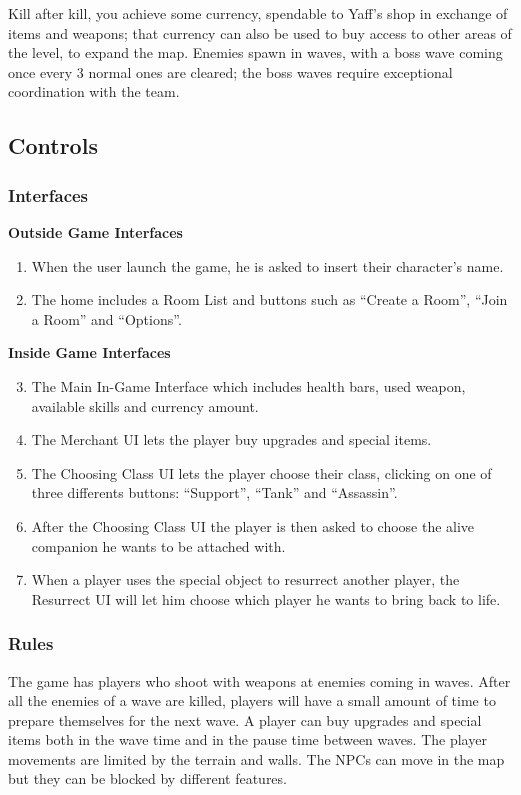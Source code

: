 \documentclass[12pt]{article}
\begin{document}
Kill after kill, you achieve some currency, spendable to Yaff’s shop in exchange of items and weapons; that currency can also be used to buy access to other areas of the level, to expand the map. Enemies spawn in waves, with a boss wave coming once every 3 normal ones are cleared; the boss waves require exceptional coordination with the team.

\subsection{Controls}

\subsubsection{Interfaces}

\textbf{Outside Game Interfaces}
\begin{enumerate}
	\item When the user launch the game, he is asked to insert their character’s name.
	\item The home includes a Room List and buttons such as “Create a Room”, “Join a Room” and “Options”.
\end{enumerate}

\textbf{Inside Game Interfaces}
\begin{enumerate}
	\setcounter{enumi}{2}
	\item The Main In-Game Interface which includes health bars, used weapon, available skills and currency amount.
	\item The Merchant UI lets the player buy upgrades and special items.
	\item The Choosing Class UI lets the player choose their class, clicking on one of three differents buttons: “Support”, “Tank” and “Assassin”.
	\item After the Choosing Class UI the player is then asked to choose the alive companion he wants to be attached with.
	\item When a player uses the special object to resurrect another player, the Resurrect UI will let him choose which player he wants to bring back to life.
\end{enumerate}

\subsubsection{Rules}

The game has players who shoot with weapons at enemies coming in waves. After all the enemies of a wave are killed, players will have a small amount of time to prepare themselves for the next wave. A player can buy upgrades and special items both in the wave time and in the pause time between waves. The player movements are limited by the terrain and walls. The NPCs can move in the map but they can be blocked by different features.
\end{document}
